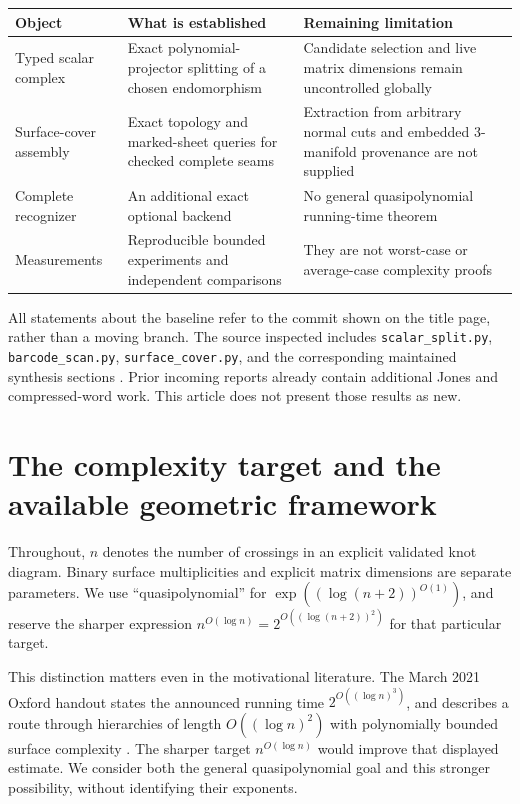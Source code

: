 \documentclass[11pt,a4paper]{article}
\theoremstyle{definition}\newtheorem{definition}[theorem]{Definition}
\theoremstyle{remark}\newtheorem{remark}[theorem]{Remark}
\newcommand{\code}[1]{\nolinkurl{#1}}
\begin{document}
\begin{center}
\begin{tabular}{p{.26\linewidth}p{.34\linewidth}p{.30\linewidth}}
\toprule
Object & What is established & Remaining limitation\\
\midrule
Typed scalar complex & Exact polynomial-projector splitting of a chosen endomorphism & Candidate selection and live matrix dimensions remain uncontrolled globally\\
Surface-cover assembly & Exact topology and marked-sheet queries for checked complete seams & Extraction from arbitrary normal cuts and embedded 3-manifold provenance are not supplied\\
Complete recognizer & An additional exact optional backend & No general quasipolynomial running-time theorem\\
Measurements & Reproducible bounded experiments and independent comparisons & They are not worst-case or average-case complexity proofs\\
\bottomrule
\end{tabular}
\end{center}

All statements about the baseline refer to the commit shown on the title
page, rather than a moving branch. The source inspected includes
\code{scalar_split.py}, \code{barcode_scan.py}, \code{surface_cover.py}, and the
corresponding maintained synthesis sections \cite{repo}. Prior incoming
reports already contain additional Jones and compressed-word work. This
article does not present those results as new.

\section{The complexity target and the available geometric framework}
\label{sec:landscape}

Throughout, $n$ denotes the number of crossings in an explicit validated knot
diagram. Binary surface multiplicities and explicit matrix dimensions are
separate parameters. We use ``quasipolynomial'' for
$\exp((\log(n+2))^{O(1)})$, and reserve the sharper expression
$n^{O(\log n)}=2^{O((\log(n+2))^2)}$ for that particular target.

This distinction matters even in the motivational literature. The March
2021 Oxford handout states the announced running time
$2^{O((\log n)^3)}$, and describes a route through hierarchies of length
$O((\log n)^2)$ with polynomially bounded surface complexity
\cite[slides 7 and 25]{lackenby-talk}. The sharper target
$n^{O(\log n)}$ would improve that displayed estimate. We consider both the
general quasipolynomial goal and this stronger possibility, without
identifying their exponents.
\end{document}
